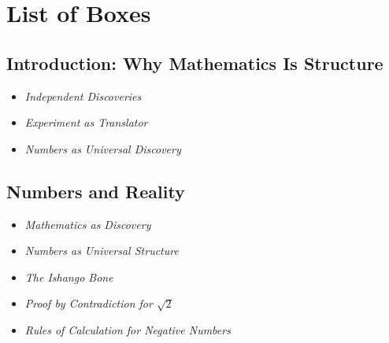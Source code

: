 \cleardoublepage

\chapter{List of Boxes}
\label{appendixB}

\thispagestyle{empty}

\section{Introduction: Why Mathematics Is \newline Structure}
\begin{NoteBox}
	
	\begin{itemize}
		\item \emph{Independent Discoveries}\dotfill \pageref{box:discovery}
		\item \emph{Experiment as Translator}\dotfill \pageref{box:experiment}
		\item \emph{Numbers as Universal Discovery}\dotfill \pageref{box:universal}
	\end{itemize}
\end{NoteBox}

\section{Numbers and Reality}
\begin{NoteBox}
	
	\begin{itemize}
		\item \emph{Mathematics as Discovery}\dotfill \pageref{box:mathdiscovery}
		\item \emph{Numbers as Universal Structure}\dotfill \pageref{box:universal_numbers}
	\end{itemize}
\end{NoteBox}

\begin{HistoryBox}
	
	\begin{itemize}
		\item \emph{The Ishango Bone}\dotfill \pageref{box:ishango}
	\end{itemize}
\end{HistoryBox}

\begin{MathBox}
	
	\begin{itemize}
		\item \emph{Proof by Contradiction for $\sqrt{2}$}\dotfill \pageref{box:contradiction}
		\item \emph{Rules of Calculation for Negative Numbers}\dotfill \pageref{box:negative}
	\end{itemize}
\end{MathBox}

